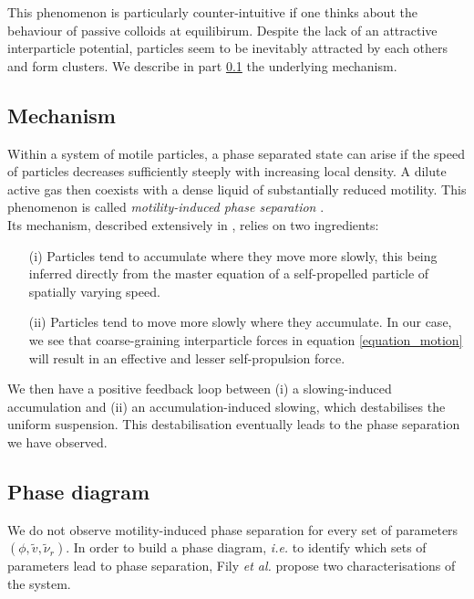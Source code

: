 \documentclass[class=report, float=false, crop=false]{standalone}
\begin{document}
This phenomenon is particularly counter-intuitive if one thinks about the behaviour of passive colloids at equilibirum. Despite the lack of an attractive interparticle potential, particles seem to be inevitably attracted by each others and form clusters. We describe in part \ref{mips_mechanism} the underlying mechanism.

\subsection{Mechanism}
\label{mips_mechanism}

Within a system of motile particles, a phase separated state can arise if the speed of particles decreases sufficiently steeply with increasing local density. A dilute active gas then coexists with a dense liquid of substantially reduced motility. This phenomenon is called \textit{motility-induced phase separation} \cite{cates2015motility}.\\

Its mechanism, described extensively in \cite{cates2015motility}, relies on two ingredients:
\begin{enumerate}
  \item[(i)] Particles tend to accumulate where they move more slowly, this being inferred directly from the master equation of a self-propelled particle of spatially varying speed.
  \item[(ii)] Particles tend to move more slowly where they accumulate. In our case, we see that coarse-graining interparticle forces in equation \ref{equation_motion} will result in an effective and lesser self-propulsion force.
\end{enumerate}
We then have a positive feedback loop between (i) a slowing-induced accumulation and (ii) an accumulation-induced slowing, which destabilises the uniform suspension. This destabilisation eventually leads to the phase separation we have observed.

\subsection{Phase diagram}
\label{subsection:phase_diagram}

We do not observe motility-induced phase separation for every set of parameters $(\phi, \tilde{v}, \tilde{\nu}_r)$. In order to build a phase diagram, \textit{i.e.} to identify which sets of parameters lead to phase separation, Fily \textit{et al.} propose two characterisations of the system.
\end{document}
